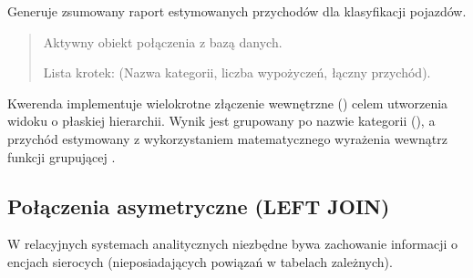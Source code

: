 \documentclass[a4paper,11pt,english,openany,oneside]{sphinxmanual}
\begin{document}
\begin{savenotes}\begin{fulllineitems}

\pysigstartsignatures
\pysiglinewithargsret
{}
{}
{}
\pysigstopsignatures
\sphinxAtStartPar
Generuje zsumowany raport estymowanych przychodów dla klasyfikacji pojazdów.
\begin{quote}\begin{description}
\sphinxAtStartPar
{} \textendash{} Aktywny obiekt połączenia z bazą danych.

\sphinxAtStartPar
Lista krotek: (Nazwa kategorii, liczba wypożyczeń, łączny przychód).

\end{description}\end{quote}

\sphinxAtStartPar
{} Kwerenda implementuje wielokrotne złączenie wewnętrzne () celem utworzenia widoku o płaskiej hierarchii. Wynik jest grupowany po nazwie kategorii (), a przychód estymowany z wykorzystaniem matematycznego wyrażenia wewnątrz funkcji grupującej .

\end{fulllineitems}\end{savenotes}



\subsection{Połączenia asymetryczne (LEFT JOIN)}
\label{\detokenize{rozdzial_5/index:polaczenia-asymetryczne-left-join}}
\sphinxAtStartPar
W relacyjnych systemach analitycznych niezbędne bywa zachowanie informacji o encjach sierocych (nieposiadających powiązań w tabelach zależnych).
\end{document}
